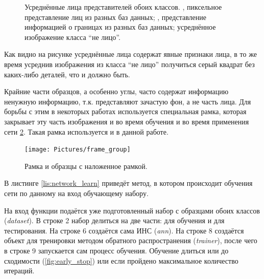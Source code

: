 \documentclass[12pt]{report}
\begin{document}
\begin{figure}[h]
	\centering
	\caption{Усреднённые лица представителей обоих классов. ,  
пиксельное представление лиц из разных баз данных; ,  
представление информацией о границах из разных баз данных;  усреднённое изображение класса 
``не лицо''.}
	\label{fig:avg_faces}
\end{figure}
Как видно на рисунке усреднённые лица содержат явные признаки лица, в то же время усреднив изображения из класса ``не 
лицо'' получиться серый квадрат без каких-либо деталей, что и должно быть.

Крайние части образцов, а особенно углы, часто содержат информацию ненужную информацию, т.к. представляют зачастую 
фон, а не часть лица. Для борьбы с этим в некоторых работах используется специальная рамка, которая закрывает эту 
часть изображения и во время обучения и во время применения сети \ref{fig:frame}. Такая рамка используется и в данной 
работе.

\begin{figure}[h]
	\centering
	\texttt{[image: Pictures/frame\_group]}
	\caption{Рамка и образцы с наложенное рамкой.}
	\label{fig:frame}
\end{figure}

В листинге \ref{lis:network_learn} приведёт метод, в котором происходит обучения сети по данному на вход обучающему 
набору.
\lstset{caption=Обучение сети на основе данного обучающего набора.,
label=lis:network_learn,
basicstyle=\footnotesize\ttfamily,
captionpos=b,
breaklines=true,
breakatwhitespace=false,
numbers=left,
numbersep=5pt,
language=Python,
}


На вход функции подаётся уже подготовленный набор с образцами обоих классов (\textit{dataset}). В строке 2 набор 
делиться на две части: для обучения и для тестирования. На строке 6 создаётся сама ИНС (\textit{ann}). На строке 8 
создаётся объект для тренировки методом обратного распространения (\textit{trainer}), после чего в строке 9 
запускается сам процесс обучения. Обучение длиться или до сходимости (\ref{fig:early_stop}) или если пройдено 
максимальное количество итераций.
\end{document}
